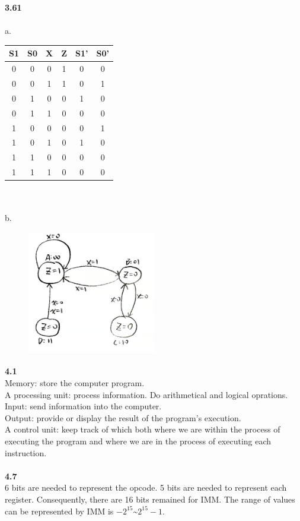 \documentclass[a4paper,12pt]{article}     %
\begin{document}
\newpage
\textbf{3.61}\\
~\\
a. \
\begin{tabular}{|c|c|c||c|c|c|}
  \hline
  S1 & S0 & X & Z & S1' & S0' \\
  \hline
  \hline
  0 & 0 & 0 & 1 & 0 & 0 \\
  \hline
  0 & 0 & 1 & 1 & 0 & 1 \\
  \hline
  0 & 1 & 0 & 0 & 1 & 0 \\
  \hline
  0 & 1 & 1 & 0 & 0 & 0 \\
  \hline
  1 & 0 & 0 & 0 & 0 & 1 \\
  \hline
  1 & 0 & 1 & 0 & 1 & 0 \\
  \hline
  1 & 1 & 0 & 0 & 0 & 0 \\
  \hline
  1 & 1 & 1 & 0 & 0 & 0 \\
  \hline
\end{tabular}\\
~\\
b. \ \begin{figure}[h] \includegraphics[width = 0.5\textwidth]{../fig/3.61.jpeg} \end{figure}

\newpage
\noindent %
\textbf{4.1}\\
Memory: store the computer program.\\
A processing unit: process information. Do arithmetical and logical oprations.\\
Input: send information into the computer.\\
Output: provide or display the result of the program's execution.\\
A control unit: keep track of which both where we are within the process of executing the program and where we are in the process of executing each instruction.\\


~\\
\textbf{4.7}\\
6 bits are needed to represent the opcode. 5 bits are needed to represent each register. Consequently, there are 16 bits remained for IMM. The range of values can be represented by IMM is $-2^{15} \mbox{\textasciitilde} 2^{15}-1.$
\end{document}
